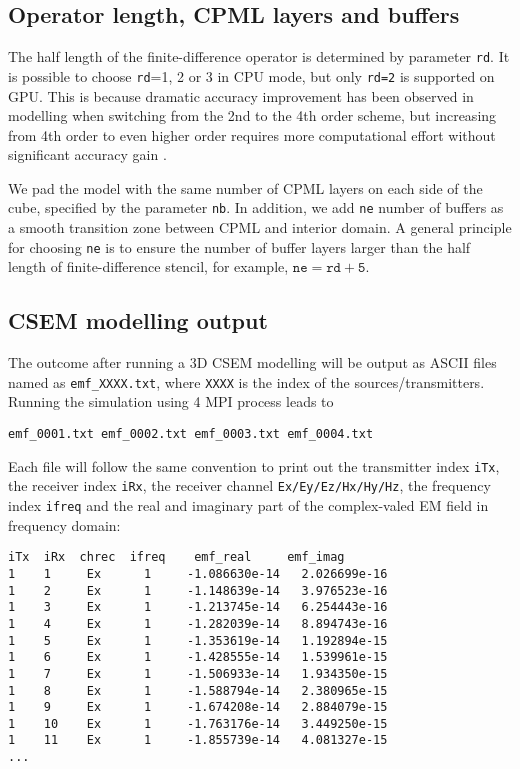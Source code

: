 \documentclass[a4paper,10pt]{article}
\begin{document}
\subsection{Operator length, CPML layers and buffers}

The half length of the finite-difference operator is determined by parameter \verb|rd|. It is possible to choose \verb|rd|=1, 2 or 3 in CPU mode, but only \verb|rd=2| is supported on GPU. This is because dramatic accuracy improvement has been observed in modelling when switching from the 2nd to the 4th order scheme, but increasing from 4th order to even higher order requires more computational effort without significant accuracy gain \citep{Yang_2023_HFDNU}.

We pad the model with the same  number of CPML layers on each side of the cube, specified by the parameter \verb|nb|. In addition, we add \verb|ne| number of buffers as a smooth transition zone between CPML and interior domain. A general principle for choosing \verb|ne| is to ensure the number of buffer layers larger than the half length of finite-difference stencil, for example, $\mathtt{ne=rd+5}$.

\subsection{CSEM modelling output}

The outcome after running a 3D CSEM modelling will be output as ASCII files named as \verb|emf_XXXX.txt|, where \verb|XXXX| is the index of the sources/transmitters. Running the simulation using 4 MPI process leads to
\begin{verbatim}
emf_0001.txt emf_0002.txt emf_0003.txt emf_0004.txt
\end{verbatim}
Each file will follow the same convention to print out the transmitter index \verb|iTx|, the receiver index \verb|iRx|, the receiver channel \verb|Ex/Ey/Ez/Hx/Hy/Hz|, the frequency index \verb|ifreq| and the real and imaginary part of the complex-valed EM field in frequency domain:
\begin{verbatim}
iTx  iRx  chrec  ifreq 	  emf_real 	   emf_imag
1    1 	   Ex 	   1 	 -1.086630e-14 	 2.026699e-16
1    2 	   Ex 	   1 	 -1.148639e-14 	 3.976523e-16
1    3 	   Ex 	   1 	 -1.213745e-14 	 6.254443e-16
1    4 	   Ex 	   1 	 -1.282039e-14 	 8.894743e-16
1    5 	   Ex 	   1 	 -1.353619e-14 	 1.192894e-15
1    6 	   Ex 	   1 	 -1.428555e-14 	 1.539961e-15
1    7 	   Ex 	   1 	 -1.506933e-14 	 1.934350e-15
1    8 	   Ex 	   1 	 -1.588794e-14 	 2.380965e-15
1    9 	   Ex 	   1 	 -1.674208e-14 	 2.884079e-15
1    10    Ex 	   1 	 -1.763176e-14 	 3.449250e-15
1    11    Ex 	   1 	 -1.855739e-14 	 4.081327e-15
...
\end{verbatim}
\end{document}
